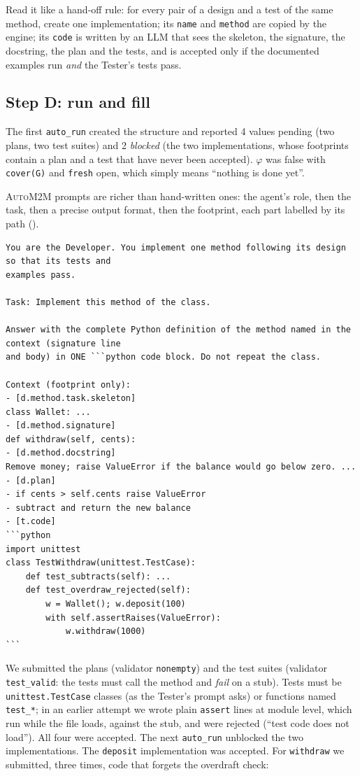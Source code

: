 \documentclass[10pt,a4paper]{article}
\newcommand{\auto}{\textsc{AutoM2M}}
\newcommand{\code}[1]{\texttt{#1}}
\newcommand{\mcptool}[1]{\texttt{#1}}
\begin{document}
Read it like a hand-off rule: for every pair of a design and a test of the
same method, create one implementation; its \code{name} and \code{method} are
copied by the engine; its \code{code} is written by an LLM that sees the
skeleton, the signature, the docstring, the plan and the tests, and is
accepted only if the documented examples run \emph{and} the Tester's tests
pass.

\subsection{Step D: run and fill}

The first \mcptool{auto\_run} created the structure and reported 4 values
pending (two plans, two test suites) and 2 \emph{blocked} (the two
implementations, whose footprints contain a plan and a test that have never
been accepted). $\varphi$ was false with \code{cover(G)} and \code{fresh}
open, which simply means ``nothing is done yet''.

\auto{} prompts are richer than hand-written ones: the agent's role, then
the task, then a precise output format, then the footprint, each part
labelled by its path ().

\begin{lstlisting}[style=llm, caption={Observed: the Developer's prompt for \code{withdraw} (skeleton and tests abridged).}, label={lst:w2prompt}]
You are the Developer. You implement one method following its design so that its tests and
examples pass.

Task: Implement this method of the class.

Answer with the complete Python definition of the method named in the context (signature line
and body) in ONE ```python code block. Do not repeat the class.

Context (footprint only):
- [d.method.task.skeleton]
class Wallet: ...
- [d.method.signature]
def withdraw(self, cents):
- [d.method.docstring]
Remove money; raise ValueError if the balance would go below zero. ...
- [d.plan]
- if cents > self.cents raise ValueError
- subtract and return the new balance
- [t.code]
```python
import unittest
class TestWithdraw(unittest.TestCase):
    def test_subtracts(self): ...
    def test_overdraw_rejected(self):
        w = Wallet(); w.deposit(100)
        with self.assertRaises(ValueError):
            w.withdraw(1000)
```
\end{lstlisting}

We submitted the plans (validator \code{nonempty}) and the test suites
(validator \code{test\_valid}: the tests must call the method and \emph{fail}
on a stub). Tests must be \code{unittest.TestCase} classes (as the Tester's
prompt asks) or functions named \code{test\_*}; in an earlier attempt we
wrote plain \code{assert} lines at module level, which run while the file
loads, against the stub, and were rejected (``test code does not load'').
All four were accepted. The next \mcptool{auto\_run} unblocked the two
implementations. The \code{deposit} implementation was accepted. For
\code{withdraw} we submitted, three times, code that forgets the overdraft
check:
\end{document}

